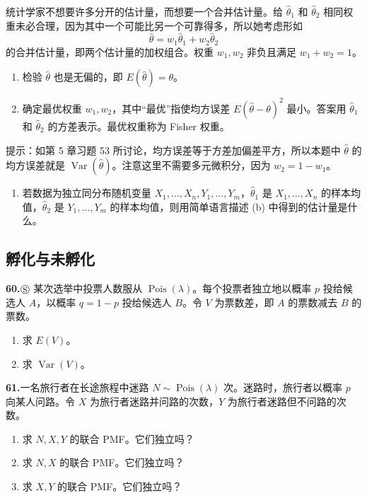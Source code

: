 \documentclass[UTF8, 12pt, fontset=fandol, oneside]{ctexart}
\begin{document}
统计学家不想要许多分开的估计量，而想要一个合并估计量。给 $\hat\theta_1$ 和 $\hat\theta_2$ 相同权重未必合理，因为其中一个可能比另一个可靠得多，所以她考虑形如
\[
  \hat\theta=w_1\hat\theta_1+w_2\hat\theta_2
\]
的合并估计量，即两个估计量的加权组合。权重 $w_1,w_2$ 非负且满足 $w_1+w_2=1$。
\begin{enumerate}
  \item[(a)] 检验 $\hat\theta$ 也是无偏的，即 $E(\hat\theta)=\theta$。
  \item[(b)] 确定最优权重 $w_1,w_2$，其中“最优”指使均方误差 $E(\hat\theta-\theta)^2$ 最小。答案用 $\hat\theta_1$ 和 $\hat\theta_2$ 的方差表示。最优权重称为 Fisher 权重。
\end{enumerate}
提示：如第 5 章习题 53 所讨论，均方误差等于方差加偏差平方，所以本题中 $\hat\theta$ 的均方误差就是 $\operatorname{Var}(\hat\theta)$。注意这里不需要多元微积分，因为 $w_2=1-w_1$。
\begin{enumerate}
  \item[(c)] 若数据为独立同分布随机变量 $X_1,\ldots,X_n,Y_1,\ldots,Y_m$，$\hat\theta_1$ 是 $X_1,\ldots,X_n$ 的样本均值，$\hat\theta_2$ 是 $Y_1,\ldots,Y_m$ 的样本均值，则用简单语言描述 (b) 中得到的估计量是什么。
\end{enumerate}

\subsection*{孵化与未孵化}

\noindent\textbf{60.}\quad $\circledS$ 某次选举中投票人数服从 $\operatorname{Pois}(\lambda)$。每个投票者独立地以概率 $p$ 投给候选人 $A$，以概率 $q=1-p$ 投给候选人 $B$。令 $V$ 为票数差，即 $A$ 的票数减去 $B$ 的票数。
\begin{enumerate}
  \item[(a)] 求 $E(V)$。
  \item[(b)] 求 $\operatorname{Var}(V)$。
\end{enumerate}

\noindent\textbf{61.}\quad 一名旅行者在长途旅程中迷路 $N\sim \operatorname{Pois}(\lambda)$ 次。迷路时，旅行者以概率 $p$ 向某人问路。令 $X$ 为旅行者迷路并问路的次数，$Y$ 为旅行者迷路但不问路的次数。
\begin{enumerate}
  \item[(a)] 求 $N,X,Y$ 的联合 PMF。它们独立吗？
  \item[(b)] 求 $N,X$ 的联合 PMF。它们独立吗？
  \item[(c)] 求 $X,Y$ 的联合 PMF。它们独立吗？
\end{enumerate}
\end{document}

